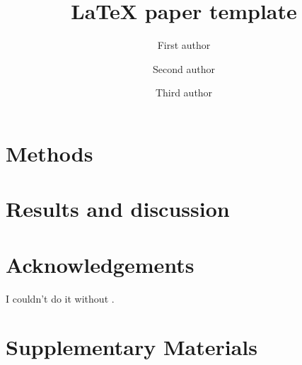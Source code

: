 \documentclass[numbers]{template}
\title{\bfseries LaTeX paper template}
\author[1,*]{First author}
\author[2]{Second author}
\author[1,2]{Third author}
\affil[1]{First affiliation}
\affil[2]{Second affiliation}
\date{}
\renewcommand{\thefootnote}{\fnsymbol{footnote}}
\begin{document}
\maketitle
\addtocounter{footnote}{1}
\vspace{-3em}


\renewcommand{\thefootnote}{\arabic{footnote}}

\begin{abstract}
\blindtext
\end{abstract}

\blindtext



\section*{Methods}
\blindtext

\section*{Results and discussion}
\blindtext

\section*{Acknowledgements}
I couldn't do it without \citep{somekey}.

%



\clearpage

\beginsupplement
\section*{Supplementary Materials}
\end{document}
